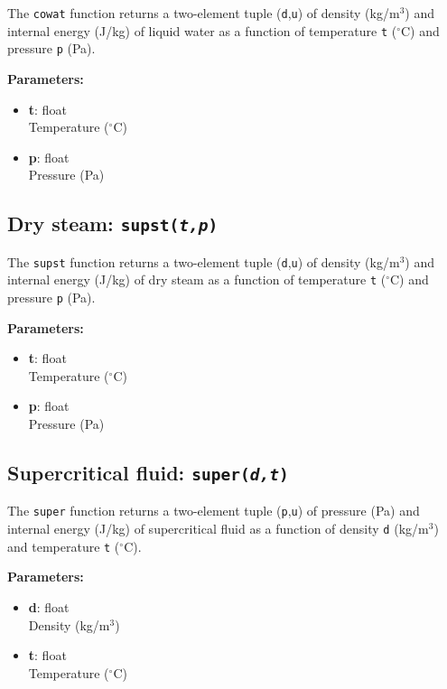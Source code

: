 The \texttt{cowat} function returns a two-element tuple (\texttt{d},\texttt{u}) of density (kg/m$^3$) and internal energy (J/kg) of liquid water as a function of temperature \texttt{t} ($^{\circ}$C) and pressure \texttt{p} (Pa).

\textbf{Parameters:}
\begin{itemize}
\item \textbf{t}: float\\
  Temperature ($^{\circ}$C)
\item \textbf{p}: float\\
  Pressure (Pa)
\end{itemize}

\subsection{Dry steam: \texttt{supst(\emph{t,p})}}

The \texttt{supst} function returns a two-element tuple (\texttt{d},\texttt{u}) of density (kg/m$^3$) and internal energy (J/kg) of dry steam as a function of temperature \texttt{t} ($^{\circ}$C) and pressure \texttt{p} (Pa).

\textbf{Parameters:}
\begin{itemize}
\item \textbf{t}: float\\
  Temperature ($^{\circ}$C)
\item \textbf{p}: float\\
  Pressure (Pa)
\end{itemize}

\subsection{Supercritical fluid: \texttt{super(\emph{d,t})}}

The \texttt{super} function returns a two-element tuple (\texttt{p},\texttt{u}) of pressure (Pa) and internal energy (J/kg) of supercritical fluid as a function of density \texttt{d} (kg/m$^3$) and temperature \texttt{t} ($^{\circ}$C).

\textbf{Parameters:}
\begin{itemize}
\item \textbf{d}: float\\
  Density (kg/m$^3$)
\item \textbf{t}: float\\
  Temperature ($^{\circ}$C)
\end{itemize}

